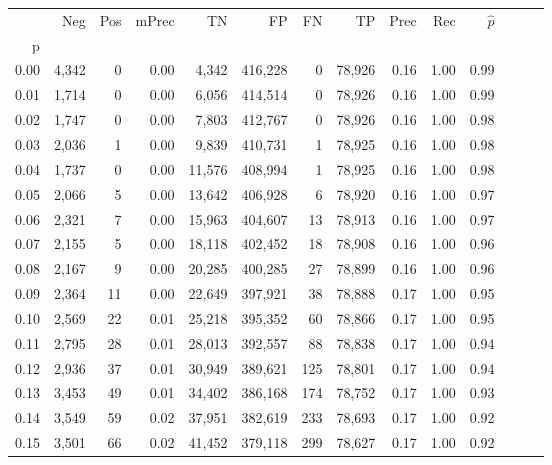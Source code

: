 \begin{tabular}{rrrrrrrrrrrrrr}
\toprule
{} &    Neg &    Pos & mPrec &       TN &       FP &      FN &      TP &  Prec &   Rec & $\hat{p}$ \\
p    &        &        &       &          &          &         &         &       &       &           \\
\midrule
0.00 &  4,342 &      0 &  0.00 &    4,342 &  416,228 &       0 &  78,926 &  0.16 &  1.00 &      0.99 \\
0.01 &  1,714 &      0 &  0.00 &    6,056 &  414,514 &       0 &  78,926 &  0.16 &  1.00 &      0.99 \\
0.02 &  1,747 &      0 &  0.00 &    7,803 &  412,767 &       0 &  78,926 &  0.16 &  1.00 &      0.98 \\
0.03 &  2,036 &      1 &  0.00 &    9,839 &  410,731 &       1 &  78,925 &  0.16 &  1.00 &      0.98 \\
0.04 &  1,737 &      0 &  0.00 &   11,576 &  408,994 &       1 &  78,925 &  0.16 &  1.00 &      0.98 \\
0.05 &  2,066 &      5 &  0.00 &   13,642 &  406,928 &       6 &  78,920 &  0.16 &  1.00 &      0.97 \\
0.06 &  2,321 &      7 &  0.00 &   15,963 &  404,607 &      13 &  78,913 &  0.16 &  1.00 &      0.97 \\
0.07 &  2,155 &      5 &  0.00 &   18,118 &  402,452 &      18 &  78,908 &  0.16 &  1.00 &      0.96 \\
0.08 &  2,167 &      9 &  0.00 &   20,285 &  400,285 &      27 &  78,899 &  0.16 &  1.00 &      0.96 \\
0.09 &  2,364 &     11 &  0.00 &   22,649 &  397,921 &      38 &  78,888 &  0.17 &  1.00 &      0.95 \\
0.10 &  2,569 &     22 &  0.01 &   25,218 &  395,352 &      60 &  78,866 &  0.17 &  1.00 &      0.95 \\
0.11 &  2,795 &     28 &  0.01 &   28,013 &  392,557 &      88 &  78,838 &  0.17 &  1.00 &      0.94 \\
0.12 &  2,936 &     37 &  0.01 &   30,949 &  389,621 &     125 &  78,801 &  0.17 &  1.00 &      0.94 \\
0.13 &  3,453 &     49 &  0.01 &   34,402 &  386,168 &     174 &  78,752 &  0.17 &  1.00 &      0.93 \\
0.14 &  3,549 &     59 &  0.02 &   37,951 &  382,619 &     233 &  78,693 &  0.17 &  1.00 &      0.92 \\
0.15 &  3,501 &     66 &  0.02 &   41,452 &  379,118 &     299 &  78,627 &  0.17 &  1.00 &      0.92 \\

\end{tabular}
